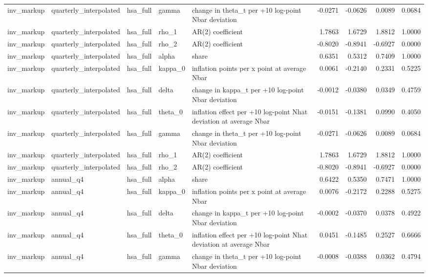 \begin{tabular}{lllllrrrr}
inv\_markup & quarterly\_interpolated & hsa\_full & gamma & change in theta\_t per +10 log-point Nbar deviation & -0.0271 & -0.0626 & 0.0089 & 0.0684 \\
inv\_markup & quarterly\_interpolated & hsa\_full & rho\_1 & AR(2) coefficient & 1.7863 & 1.6729 & 1.8812 & 1.0000 \\
inv\_markup & quarterly\_interpolated & hsa\_full & rho\_2 & AR(2) coefficient & -0.8020 & -0.8941 & -0.6927 & 0.0000 \\
inv\_markup & quarterly\_interpolated & hsa\_full & alpha & share & 0.6351 & 0.5312 & 0.7409 & 1.0000 \\
inv\_markup & quarterly\_interpolated & hsa\_full & kappa\_0 & inflation points per x point at average Nbar & 0.0061 & -0.2140 & 0.2331 & 0.5225 \\
inv\_markup & quarterly\_interpolated & hsa\_full & delta & change in kappa\_t per +10 log-point Nbar deviation & -0.0012 & -0.0380 & 0.0349 & 0.4759 \\
inv\_markup & quarterly\_interpolated & hsa\_full & theta\_0 & inflation effect per +10 log-point Nhat deviation at average Nbar & -0.0151 & -0.1381 & 0.0990 & 0.4050 \\
inv\_markup & quarterly\_interpolated & hsa\_full & gamma & change in theta\_t per +10 log-point Nbar deviation & -0.0271 & -0.0626 & 0.0089 & 0.0684 \\
inv\_markup & quarterly\_interpolated & hsa\_full & rho\_1 & AR(2) coefficient & 1.7863 & 1.6729 & 1.8812 & 1.0000 \\
inv\_markup & quarterly\_interpolated & hsa\_full & rho\_2 & AR(2) coefficient & -0.8020 & -0.8941 & -0.6927 & 0.0000 \\
inv\_markup & annual\_q4 & hsa\_full & alpha & share & 0.6422 & 0.5350 & 0.7471 & 1.0000 \\
inv\_markup & annual\_q4 & hsa\_full & kappa\_0 & inflation points per x point at average Nbar & 0.0076 & -0.2172 & 0.2288 & 0.5275 \\
inv\_markup & annual\_q4 & hsa\_full & delta & change in kappa\_t per +10 log-point Nbar deviation & -0.0002 & -0.0370 & 0.0378 & 0.4922 \\
inv\_markup & annual\_q4 & hsa\_full & theta\_0 & inflation effect per +10 log-point Nhat deviation at average Nbar & 0.0451 & -0.1485 & 0.2527 & 0.6666 \\
inv\_markup & annual\_q4 & hsa\_full & gamma & change in theta\_t per +10 log-point Nbar deviation & -0.0008 & -0.0388 & 0.0362 & 0.4794 \\

\end{tabular}
